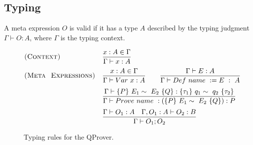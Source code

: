 \subsection{Typing}
\begin{definition}
    A meta expression $O$ is valid if it has a type $A$ described by the typing judgment $\Gamma \vdash O:A$, where $\Gamma$ is the typing context.
\end{definition}

\begin{figure}[t]
 \centering
 \small
 \begin{align*}
        & \textsc{(Context)} &&
 \frac{x : A \in \Gamma}{\Gamma \vdash x : A}
 \qquad \qquad \qquad \qquad 
 \\[0.1cm]
&\textsc{(Meta ~Expressions)}&& 
    \frac{x:A \in \Gamma}{\Gamma \vdash Var ~x:A}
    \quad \quad
    \frac{\Gamma \vdash E : A}{\Gamma \vdash Def ~name~:=E~:~A} 
    \\[0.1cm]
    & && \frac{\Gamma \vdash \{P\} ~E_1 \sim ~E_2~\{Q\}: \{\tau_1\} ~q_1 \sim ~q_2~\{\tau_2\}}{\Gamma \vdash Prove ~name~ : (\{P\} ~E_1 \sim ~E_2~\{Q\}):P} \\[0.1cm]
    & && \frac{\Gamma\vdash O_1:A \quad \Gamma,O_1:A \vdash O_2 : B}{\Gamma \vdash O_1; O_2}
 \end{align*}
 \caption{Typing rules for the QProver.}
    \label{fig: DN typing}
\end{figure}